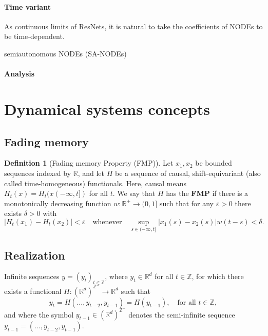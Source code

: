 \documentclass{article}
\theoremstyle{definition}
\newtheorem{definition}{Definition}
\theoremstyle{remark}
\newcounter{ct}
\begin{document}

\paragraph{Time variant}
As continuous limits of ResNets, it is natural to take the coefficients of NODEs to be time-dependent.

semiautonomous NODEs (SA-NODEs) \citep{li2024universal}


\paragraph{Analysis}
\citep{massaroli2020nodes}




\section{Dynamical systems concepts}
\subsection{Fading memory}
\begin{definition}[Fading memory Property (FMP)]
Let $x_1, x_2$ be bounded sequences indexed by $\mathbb{R}$, and let $H$ be a sequence of causal, shift-equivariant (also called time-homogeneous) functionals.
Here, causal means $H_t(x) = H_t(x(-\infty,t])$ for all $t$.
We say that $H$ has the \textbf{FMP} if there is a monotonically decreasing function $w : \mathbb{R}^+ \to (0, 1]$ such that for any $\varepsilon > 0$ there exists $\delta > 0$ with 
\[
|H_t(x_1) - H_t(x_2)| < \varepsilon \quad \text{whenever} \quad \sup_{s \in (-\infty, t]} |x_1(s) - x_2(s)| w(t - s) < \delta.
\]
\end{definition}

\subsection{Realization}\label{sec:realization}

Infinite sequences \( y = (y_t)_{t \in \mathbb{Z}} \), where \( y_t \in \mathbb{R}^d \) for all \( t \in \mathbb{Z} \), for which there exists a functional \( H : (\mathbb{R}^d)^{\mathbb{Z}^-} \rightarrow \mathbb{R}^d \) such that 
\begin{equation}\label{eq:filter}
y_t = H(\ldots, y_{t-2}, y_{t-1}) = H\left( y_{t-1} \right), \quad \text{for all } t \in \mathbb{Z},
\end{equation}
and where the symbol \( y_{t-1} \in (\mathbb{R}^d)^{\mathbb{Z}^-} \) denotes the semi-infinite sequence \( y_{t-1} = (\ldots, y_{t-2}, y_{t-1}) \).
\end{document}
